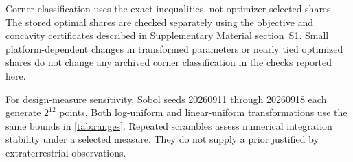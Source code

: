 Corner classification uses the exact inequalities, not optimizer-selected shares. The stored optimal shares are checked separately using the objective and concavity certificates described in Supplementary Material section~S1. Small platform-dependent changes in transformed parameters or nearly tied optimized shares do not change any archived corner classification in the checks reported here.

For design-measure sensitivity, Sobol seeds 20260911 through 20260918 each generate $2^{12}$ points. Both log-uniform and linear-uniform transformations use the same bounds in \cref{tab:ranges}. Repeated scrambles assess numerical integration stability under a selected measure. They do not supply a prior justified by extraterrestrial observations.

